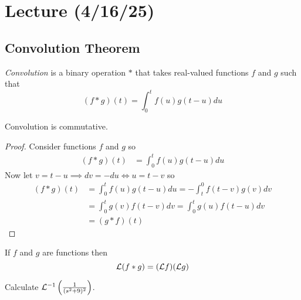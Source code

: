 \documentclass[notes]{subfiles}
\begin{document}
\setcounter{section}{19}
\section{Lecture (4/16/25)}

\subsection{Convolution Theorem}
\begin{definition}
    \textit{Convolution} is a binary operation $\ast$ that takes real-valued functions $f$ and $g$ such that
    \[
        (f\ast g)(t) = \int_0^t f(u)g(t - u)du
    \]
\end{definition}

\begin{lemma}
    Convolution is commutative.
\end{lemma}
\begin{proof}
    Consider functions $f$ and $g$ so
    \begin{align*}
        (f\ast g)(t)
        &= \int_0^t f(u)g(t - u)du
    \end{align*}
    Now let $v = t - u \implies dv = -du \iff u = t - v$ so
    \begin{align*}
        (f\ast g)(t)
        &= \int_0^t f(u)g(t - u)du
        = -\int_t^0 f(t - v)g(v)dv \\
        &= \int_0^t g(v)f(t - v)dv
        = \int_0^t g(u)f(t - u)dv \\
        &= (g \ast f)(t)
    \end{align*}
\end{proof}

\begin{theorem}
    If $f$ and $g$ are functions then
    \[
        \mathcal{L}(f \ast g) = (\mathcal{L} f)(\mathcal{L} g)
    \]
\end{theorem}

\begin{exercise}
    Calculate $\mathcal{L}^{-1}\left( \frac{1}{(s^2 + 9)^2} \right)$.
\end{exercise}
\begin{solution}
    
\end{solution}
\end{document}
